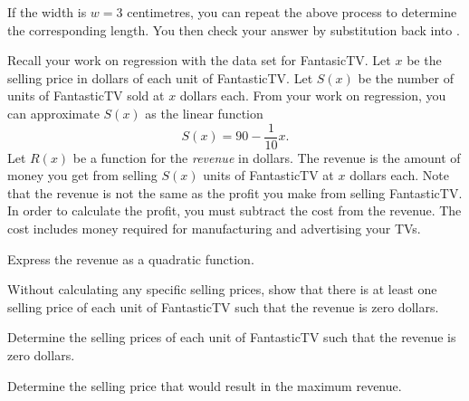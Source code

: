 \documentclass[a4paper,oneside,12pt]{article}
\begin{document}
\begin{problem}
{\begin{solution}
If the width is $w = 3$ centimetres, you can repeat the above process
to determine the corresponding length.  You then check your answer by
substitution back into
.
\end{solution}
}{}

\item Recall your work on regression with the data set for
  FantasicTV.  Let $x$ be the selling price in dollars of each unit of
  FantasticTV.  Let $S(x)$ be the number of units of FantasticTV sold
  at $x$ dollars each.  From your work on regression, you can
  approximate $S(x)$ as the linear function
  \[
  S(x)
  =
  90 - \frac{1}{10}x.
  \]
  Let $R(x)$ be a function for the \emph{revenue} in dollars.  The
  revenue is the amount of money you get from selling $S(x)$ units of
  FantasticTV at $x$ dollars each.  Note that the revenue is not the
  same as the profit you make from selling FantasticTV.  In order to
  calculate the profit, you must subtract the cost from the revenue.
  The cost includes money required for manufacturing and advertising
  your TVs.
  \begin{packedenum}
  \item\label{subprob:FantasticTV_total_revenue}
    Express the revenue as a quadratic function.

  \item\label{subprob:FantasticTV_zero_revenue_exist}
    Without calculating any specific selling prices, show that there
    is at least one selling price of each unit of FantasticTV such
    that the revenue is zero dollars.

  \item\label{subprob:FantasticTV_zero_revenue}
    Determine the selling prices of each unit of FantasticTV such that
    the revenue is zero dollars.

  \item\label{subprob:FantasticTV_maximize_revenue}
    Determine the selling price that would result in the maximum
    revenue.
  \end{packedenum}
\end{problem}
\end{document}
